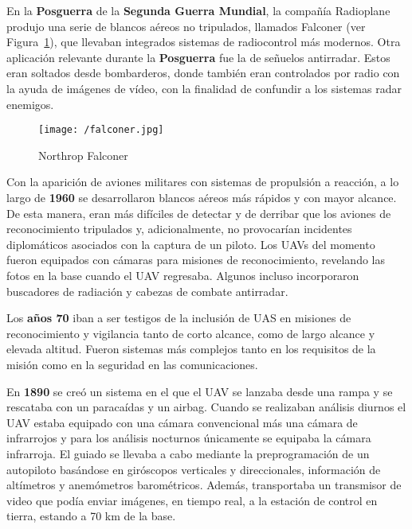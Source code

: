 En la \textbf{Posguerra} de la \textbf{Segunda Guerra Mundial}, la compañía Radioplane produjo una serie de blancos aéreos no tripulados, llamados Falconer (ver Figura~\ref{fig:falconer}), que llevaban integrados sistemas de radiocontrol más modernos. 
Otra aplicación relevante durante la \textbf{Posguerra} fue la de señuelos antirradar. Estos eran soltados desde 
bombarderos, donde también eran controlados por radio con la ayuda de imágenes de vídeo, con la finalidad de confundir a los sistemas radar enemigos.

\begin{figure}[!h]
\begin{center}
\texttt{[image: /falconer.jpg]}
\caption[Caption]{Northrop Falconer}
\label{fig:falconer}
\end{center}
\end{figure}

Con la aparición de aviones militares con sistemas de propulsión a reacción, a lo largo de \textbf{1960}
se desarrollaron blancos aéreos más rápidos y con mayor alcance. De esta manera, eran más difíciles de detectar y de derribar que los aviones de reconocimiento tripulados y, adicionalmente, no provocarían incidentes diplomáticos asociados con la captura de un piloto. 
Los \acs{UAV}s del momento fueron equipados con cámaras para misiones de reconocimiento, revelando las fotos en la base cuando el \acs{UAV} regresaba.
Algunos incluso incorporaron buscadores de radiación y cabezas de combate antirradar.

Los \textbf{años 70} iban a ser testigos de la inclusión de \acs{UAS} en misiones de 
reconocimiento y vigilancia tanto de corto alcance, como de largo alcance y elevada altitud. Fueron sistemas 
más complejos tanto en los requisitos de la misión como en la seguridad en las comunicaciones.

En \textbf{1890} se creó un sistema en el que el \acs{UAV} se lanzaba desde una rampa y se rescataba con un paracaídas y un airbag. 
Cuando se realizaban análisis diurnos el \acs{UAV} estaba equipado con una cámara convencional más una cámara de infrarrojos y para los análisis nocturnos únicamente se equipaba la cámara infrarroja. El guiado se llevaba a cabo mediante la preprogramación de un autopiloto basándose en giróscopos verticales y direccionales, información de altímetros y anemómetros barométricos. 
Además, transportaba un transmisor de video que podía enviar imágenes, en tiempo real, a la estación de control 
en tierra, estando a 70 km de la base.

